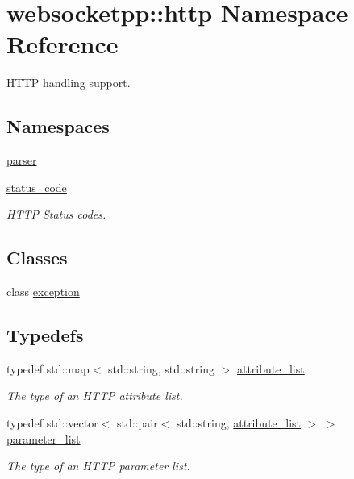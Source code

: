 \hypertarget{namespacewebsocketpp_1_1http}{}\section{websocketpp\+:\+:http Namespace Reference}
\label{namespacewebsocketpp_1_1http}


H\+T\+T\+P handling support.  


\subsection*{Namespaces}
\begin{DoxyCompactItemize}
\item 
 \hyperlink{namespacewebsocketpp_1_1http_1_1parser}{parser}
\item 
 \hyperlink{namespacewebsocketpp_1_1http_1_1status__code}{status\+\_\+code}
\begin{DoxyCompactList}\small\item\em H\+T\+T\+P Status codes. \end{DoxyCompactList}\end{DoxyCompactItemize}
\subsection*{Classes}
\begin{DoxyCompactItemize}
\item 
class \hyperlink{classwebsocketpp_1_1http_1_1exception}{exception}
\end{DoxyCompactItemize}
\subsection*{Typedefs}
\begin{DoxyCompactItemize}
\item 
typedef std\+::map$<$ std\+::string, std\+::string $>$ \hyperlink{namespacewebsocketpp_1_1http_a9744f4104772b987aa9e86c35ce1357b}{attribute\+\_\+list}
\begin{DoxyCompactList}\small\item\em The type of an H\+T\+T\+P attribute list. \end{DoxyCompactList}\item 
typedef std\+::vector$<$ std\+::pair$<$ std\+::string, \hyperlink{namespacewebsocketpp_1_1http_a9744f4104772b987aa9e86c35ce1357b}{attribute\+\_\+list} $>$ $>$ \hyperlink{namespacewebsocketpp_1_1http_a2c285bc959df5a63bf962bed842fccfb}{parameter\+\_\+list}
\begin{DoxyCompactList}\small\item\em The type of an H\+T\+T\+P parameter list. \end{DoxyCompactList}\end{DoxyCompactItemize}
